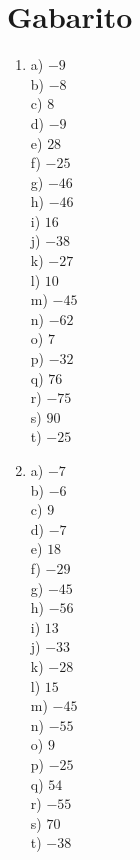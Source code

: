 \documentclass{exam}
\begin{document}
\newpage
\section{Gabarito}

\begin{multicols*}{4}
\setlength{\columnseprule}{1pt}
\begin{enumerate}

\item 	a) $-9$ \\
		b) $-8$ \\
		c) $8$ \\
		d) $-9$ \\
		e) $28$ \\
		f) $-25$ \\
		g) $-46$ \\
		h) $-46$ \\
		i) $16$ \\
		j) $-38$ \\
		k) $-27$ \\
		l) $10$ \\
		m) $-45$ \\
		n) $-62$ \\
		o) $7$ \\
		p) $-32$ \\
		q) $76$ \\
		r) $-75$ \\
		s) $90$ \\
		t) $-25$ \\
		
\item 	a) $-7$ \\
		b) $-6$ \\
		c) $9$ \\
		d) $-7$ \\
		e) $18$ \\
		f) $-29$ \\
		g) $-45$ \\
		h) $-56$ \\
		i) $13$ \\
		j) $-33$ \\
		k) $-28$ \\
		l) $15$ \\
		m) $-45$ \\
		n) $-55$ \\
		o) $9$ \\
		p) $-25$ \\
		q) $54$ \\
		r) $-55$ \\
		s) $70$ \\
		t) $-38$ \\


\end{enumerate}
\end{multicols*}
\end{document}
